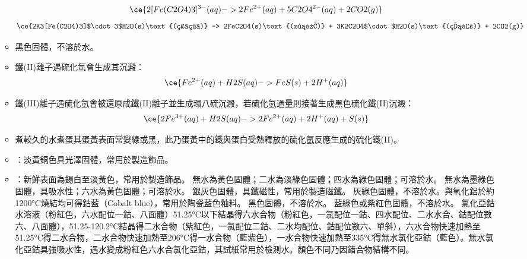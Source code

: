 \documentclass[a4paper,12pt]{report}
\begin{document}
\begin{itemize}
\begin{itemize}
\[\ce{2[Fe(C2O4)3]^{3-}(aq) -> 2Fe^{2+}(aq) + 5C2O4^{2-}(aq) + 2CO2(g)}\]
\[\ce{2K3[Fe(C2O4)3]$\cdot 3$H2O(s)\text{(翠綠)} -> 2FeC2O4(s)\text{(淡黃)} + 3K2C2O4$\cdot$H2O(s)\text{(無色)} + 2CO2(g)}\]
\eit
{}
\bit
\item 黑色固體，不溶於水。
\item 鐵(II)離子遇硫化氫會生成其沉澱：
\[\ce{Fe^{2+}(aq) + H2S(aq) -> FeS(s) + 2H^+(aq)}\]
\item 鐵(III)離子遇硫化氫會被還原成鐵(II)離子並生成環八硫沉澱，若硫化氫過量則接著生成黑色硫化鐵(II)沉澱：
\[\ce{2Fe^{3+}(aq) + H2S(aq) -> 2Fe^{2+}(aq) + 2H^+(aq) + S(s)}\]
\item 煮較久的水煮蛋其蛋黃表面常變綠或黑，此乃蛋黃中的鐵與蛋白受熱釋放的硫化氫反應生成的硫化鐵(II)。
\eit
{}
\bit
\item {}：淡黃銅色具光澤固體，常用於製造飾品。
\item {}：新鮮表面為錫白至淡黃色，常用於製造飾品。
\eit
{}
無水為黃色固體；二水為淡綠色固體；四水為綠色固體；可溶於水。
無水為墨綠色固體，具吸水性；六水為黃色固體；可溶於水。
銀灰色固體，具鐵磁性，常用於製造磁鐵。
灰綠色固體，不溶於水。與氧化鋁於約1200°C燒結均可得鈷藍（Cobalt blue），常用於陶瓷藍色釉料。
黑色固體，不溶於水。
藍綠色或紫紅色固體，不溶於水。
氯化亞鈷水溶液（粉紅色，六水配位一鈷、八面體）51.25°C以下結晶得六水合物（粉紅色，一氯配位一鈷、四水配位、二水水合、鈷配位數六、八面體），51.25-120.2°C結晶得二水合物\ce{[Co(H2O)2Cl2]}（紫紅色，一氯配位二鈷、二水均配位、鈷配位數六、單斜），六水合物快速加熱至51.25°C得二水合物，二水合物快速加熱至206°C得一水合物（藍紫色），一水合物快速加熱至335°C得無水氯化亞鈷（藍色）。無水氯化亞鈷具強吸水性，遇水變成粉紅色六水合氯化亞鈷，其試紙常用於檢測水。顏色不同乃因錯合物結構不同。


\end{itemize}
\end{itemize}
\end{document}
